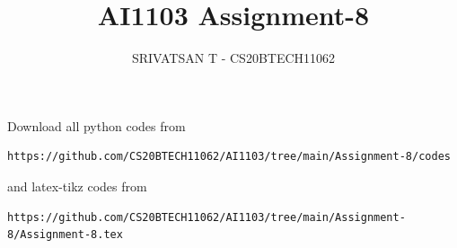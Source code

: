 \documentclass[journal,12pt,twocolumn]{IEEEtran}
\DeclareMathOperator*{\Res}{Res}
\begin{document}
\newcommand{\BEQA}{\begin{eqnarray}}
        \newcommand{\EEQA}{\end{eqnarray}}
\newcommand{\define}{\stackrel{\triangle}{=}}

\raggedbottom
\setlength{\parindent}{0pt}
\providecommand{\mbf}{\mathbf}
\providecommand{\pr}[1]{\ensuremath{\Pr\left(#1\right)}}
\providecommand{\qfunc}[1]{\ensuremath{Q\left(#1\right)}}
\providecommand{\sbrak}[1]{\ensuremath{{}\left[#1\right]}}
\providecommand{\lsbrak}[1]{\ensuremath{{}\left[#1\right.}}
\providecommand{\rsbrak}[1]{\ensuremath{{}\left.#1\right]}}
\providecommand{\brak}[1]{\ensuremath{\left(#1\right)}}
\providecommand{\lbrak}[1]{\ensuremath{\left(#1\right.}}
\providecommand{\rbrak}[1]{\ensuremath{\left.#1\right)}}
\providecommand{\cbrak}[1]{\ensuremath{\left\{#1\right\}}}
\providecommand{\lcbrak}[1]{\ensuremath{\left\{#1\right.}}
\providecommand{\rcbrak}[1]{\ensuremath{\left.#1\right\}}}
\theoremstyle{remark}
\newtheorem{rem}{Remark}
\newcommand{\sgn}{\mathop{\mathrm{sgn}}}
\providecommand{\abs}[1]{\vert#1\vert}
\providecommand{\res}[1]{\Res\displaylimits_{#1}}
\providecommand{\norm}[1]{\lVert#1\rVert}
\providecommand{\mtx}[1]{\mathbf{#1}}
\providecommand{\mean}[1]{E[#1]}
\providecommand{\fourier}{\overset{\mathcal{F}}{ \rightleftharpoons}}
\providecommand{\system}{\overset{\mathcal{H}}{ \longleftrightarrow}}
\newcommand{\solution}{\noindent \textbf{Solution: }}
\newcommand{\cosec}{\,\text{cosec}\,}
\newcommand{\comb}[2]{{}^{#1}\mathrm{C}_{#2}}
\providecommand{\dec}[2]{\ensuremath{\overset{#1}{\underset{#2}{\gtrless}}}}
\newcommand{\myvec}[1]{\ensuremath{\begin{pmatrix}#1\end{pmatrix}}}
\newcommand{\mydet}[1]{\ensuremath{\begin{vmatrix}#1\end{vmatrix}}}
\makeatletter
{}
\makeatother
\let\StandardTheFigure\thefigure
\let\vec\mathbf
\renewcommand{\thefigure}{\theproblem}
\def\putbox#1#2#3{\makebox[0in][l]{\makebox[#1][l]{}\raisebox{\baselineskip}[0in][0in]{\raisebox{#2}[0in][0in]{#3}}}}
\def\rightbox#1{\makebox[0in][r]{#1}}
\def\centbox#1{\makebox[0in]{#1}}
\def\topbox#1{\raisebox{-\baselineskip}[0in][0in]{#1}}
\def\midbox#1{\raisebox{-0.5\baselineskip}[0in][0in]{#1}}
\vspace{3cm}
\title{AI1103 Assignment-8}
\author{SRIVATSAN T - CS20BTECH11062}
\maketitle
\newpage
\bigskip
\renewcommand{\thefigure}{\theenumi}
\renewcommand{\thetable}{\theenumi}
Download all python codes from
\begin{lstlisting}
https://github.com/CS20BTECH11062/AI1103/tree/main/Assignment-8/codes
\end{lstlisting}
%
and latex-tikz codes from
%
\begin{lstlisting}
https://github.com/CS20BTECH11062/AI1103/tree/main/Assignment-8/Assignment-8.tex
\end{lstlisting}
\end{document}

